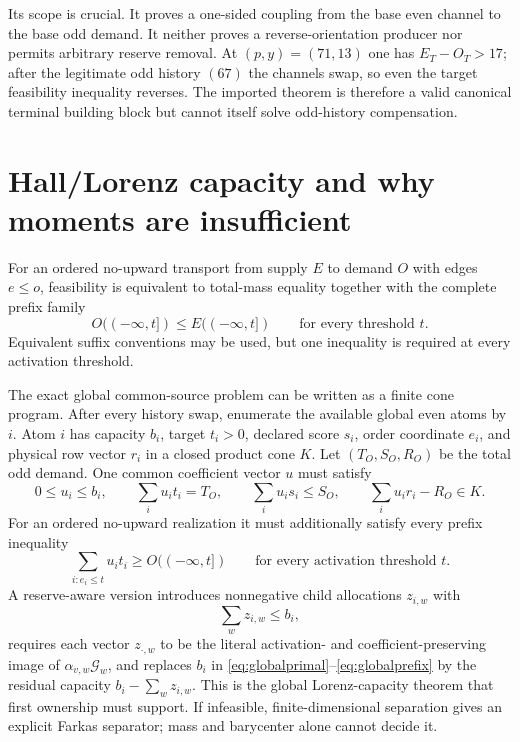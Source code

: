 \documentclass[11pt]{article}
\newcommand{\1}{\mathbf 1}
\begin{document}
Its scope is crucial.  It proves a one-sided coupling from the base even channel to the base odd demand.  It neither proves a reverse-orientation producer nor permits arbitrary reserve removal.  At $(p,y)=(71,13)$ one has $E_T-O_T>17$; after the legitimate odd history $(67)$ the channels swap, so even the target feasibility inequality reverses.  The imported theorem is therefore a valid canonical terminal building block but cannot itself solve odd-history compensation.

\section{Hall/Lorenz capacity and why moments are insufficient}

For an ordered no-upward transport from supply $E$ to demand $O$ with edges $e\le o$, feasibility is equivalent to total-mass equality together with the complete prefix family
\begin{equation}\label{eq:hallprefix}
O(({-}\infty,t])\le E(({-}\infty,t])
\qquad\text{for every threshold }t.
\end{equation}
Equivalent suffix conventions may be used, but one inequality is required at every activation threshold.

The exact global common-source problem can be written as a finite cone program.  After every history swap, enumerate the available global even atoms by $i$.  Atom $i$ has capacity $b_i$, target $t_i>0$, declared score $s_i$, order coordinate $e_i$, and physical row vector $r_i$ in a closed product cone $K$.  Let $(T_O,S_O,R_O)$ be the total odd demand.  One common coefficient vector $u$ must satisfy
\begin{equation}\label{eq:globalprimal}
0\le u_i\le b_i,
\qquad
\sum_i u_it_i=T_O,
\qquad
\sum_i u_is_i\le S_O,
\qquad
\sum_i u_ir_i-R_O\in K.
\end{equation}
For an ordered no-upward realization it must additionally satisfy every prefix inequality
\begin{equation}\label{eq:globalprefix}
\sum_{i:e_i\le t}u_it_i\ge O(({-}\infty,t])
\qquad\text{for every activation threshold }t.
\end{equation}
A reserve-aware version introduces nonnegative child allocations $z_{i,w}$ with
\[
\sum_w z_{i,w}\le b_i,
\]
requires each vector $z_{\cdot,w}$ to be the literal activation- and coefficient-preserving image of $\alpha_{v,w}\mathcal G_w$, and replaces $b_i$ in \eqref{eq:globalprimal}--\eqref{eq:globalprefix} by the residual capacity $b_i-\sum_wz_{i,w}$.  This is the global Lorenz-capacity theorem that first ownership must support.  If infeasible, finite-dimensional separation gives an explicit Farkas separator; mass and barycenter alone cannot decide it.
\end{document}
